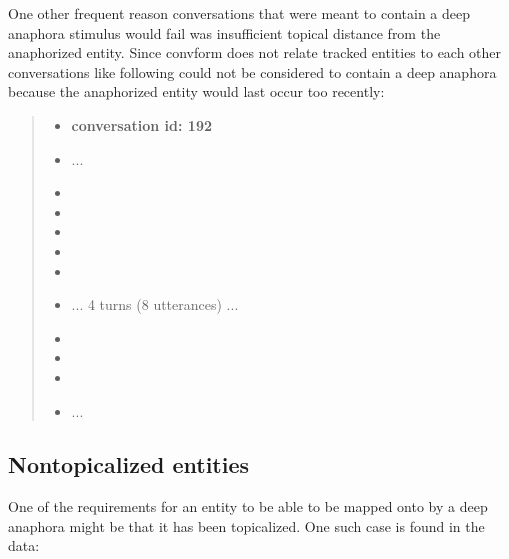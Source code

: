     One other frequent reason conversations that were
    meant to contain a deep anaphora stimulus would fail
    was insufficient topical distance from the anaphorized entity.
    Since convform does not relate tracked entities to each other
    conversations like following could not be considered to contain a deep anaphora
    because the anaphorized entity would last occur too recently:

    \begin{quote}
    \begin{itemize}[label={}, leftmargin=0pt, itemsep=0.5em]
    \item \textbf{conversation id: 192}
    \item ...
    \item {}
    \item {}
    \item {}
    \item {}
    \item {}
    \item ... 4 turns (8 utterances) ...
    \item {}
    \item {}
    \item {}
    \item ...
    \end{itemize}
    \end{quote}

\subsection{Nontopicalized entities}

    One of the requirements for an entity
    to be able to be mapped onto by a deep anaphora
    might be that it has been topicalized.
    One such case is found in the data:

